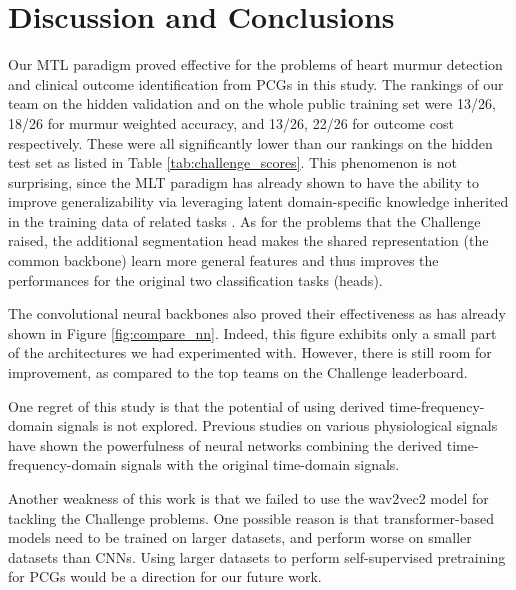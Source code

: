 \section{Discussion and Conclusions}
\label{sec:discu}

Our MTL paradigm proved effective for the problems of heart murmur detection and clinical outcome identification from PCGs in this study. The rankings of our team on the hidden validation and on the whole public training set were 13/26, 18/26 for murmur weighted accuracy, and 13/26, 22/26 for outcome cost respectively. These were all significantly lower than our rankings on the hidden test set as listed in Table \ref{tab:challenge_scores}. This phenomenon is not surprising, since the MLT paradigm has already shown to have the ability to improve generalizability via leveraging latent domain-specific knowledge inherited in the training data of related tasks \cite{Caruana_1997_mtl}. As for the problems that the Challenge raised, the additional segmentation head makes the shared representation (the common backbone) learn more general features and thus improves the performances for the original two classification tasks (heads).

The convolutional neural backbones also proved their effectiveness as has already shown in Figure \ref{fig:compare_nn}. Indeed, this figure exhibits only a small part of the architectures we had experimented with. However, there is still room for improvement, as compared to the top teams on the Challenge leaderboard.

One regret of this study is that the potential of using derived time-frequency-domain signals is not explored. Previous studies on various physiological signals have shown the powerfulness of neural networks combining the derived time-frequency-domain signals with the original time-domain signals.

Another weakness of this work is that we failed to use the wav2vec2 model for tackling the Challenge problems. One possible reason is that transformer-based models need to be trained on larger datasets, and perform worse on smaller datasets than CNNs. Using larger datasets to perform self-supervised pretraining for PCGs would be a direction for our future work.

